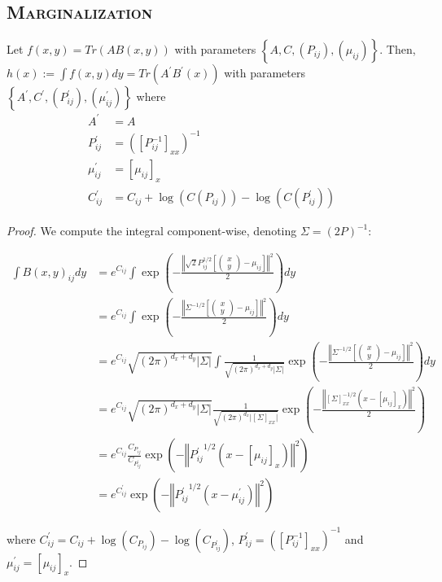 \subsection{\textsc{Marginalization}}
\begin{proposition}
   Let $f(x, y) = Tr(AB(x, y))$ with parameters $\left\lbrace A, C, (P_{ij}), (\mu_{ij})\right\rbrace$. Then, $h(x):=\int f(x, y)dy = Tr(A^\prime B^\prime(x))$ with parameters $\left\lbrace A^\prime, C^\prime, (P^\prime_{ij}), (\mu^\prime_{ij})\right\rbrace$ where
   \begin{align}
       A^\prime &= A\\
        P_{ij}^\prime &= \left(\left[P^{-1}_{ij}\right]_{xx}\right)^{-1}\\
       \mu^\prime_{ij} &= \left[\mu_{ij}\right]_{x}\\
          C^\prime_{ij} &= C_{ij} + \log(C(P_{ij})) - \log(C(P^ \prime_{ij}))
       \end{align}
\end{proposition}
\begin{proof}
We compute the integral component-wise, denoting $\Sigma = (2P)^{-1}$:

\begin{align}
    \int B(x, y)_{ij}dy &= e^{C_{ij}}\int \exp\left(- \frac{\left\Vert \sqrt{2}P_{ij}^{1/2}\left[\begin{pmatrix}x\\ y\end{pmatrix} - \mu_{ij}\right] \right\Vert^2}{2}\right)dy\\
    &= e^{C_{ij}}\int \exp\left(- \frac{\left\Vert \Sigma^{-1/2}\left[\begin{pmatrix}x\\ y\end{pmatrix} - \mu_{ij}\right] \right\Vert^2}{2}\right)dy\\
    &= e^{C_{ij}}\sqrt{(2\pi)^{d_x + d_y}\vert \Sigma \vert}\int \frac{1}{\sqrt{(2\pi)^{d_x + d_y}\vert \Sigma \vert}}\exp\left(- \frac{\left\Vert \Sigma^{-1/2}\left[\begin{pmatrix}x\\ y\end{pmatrix} - \mu_{ij}\right] \right\Vert^2}{2}\right)dy\\
    &= e^{C_{ij}}\sqrt{(2\pi)^{d_x + d_y}\vert \Sigma\vert}\frac{1}{\sqrt{(2\pi)^{d_x}\vert \left[\Sigma\right]_{xx}\vert}}\exp\left(- \frac{\left\Vert [\Sigma]_{xx}^{-1/2}\left( x - \left[\mu_{ij}\right]_x\right)\right\Vert^2}{2}\right)\\
    &= e^{C_{ij}}\frac{C_{P_{ij}}}{C_{P_{ij}^\prime}}\exp\left(-\left\Vert {P_{ij}^\prime}^{1/2}\left( x - \left[\mu_{ij}\right]_x\right)\right\Vert^2\right)\\
    &= e^{C^\prime_{ij}}\exp\left(-\left\Vert {P_{ij}^\prime}^{1/2}\left( x - \mu_{ij}^\prime\right)\right\Vert^2\right)
\end{align}

where $C^\prime_{ij} = C_{ij} + \log(C_{P_{ij}}) - \log(C_{P^\prime_{ij}})$, $P^\prime_{ij} = \left(\left[P_{ij}^{-1}\right]_{xx}\right)^{-1}$ and $\mu_{ij}^\prime = \left[\mu_{ij}\right]_x$.
\end{proof}

